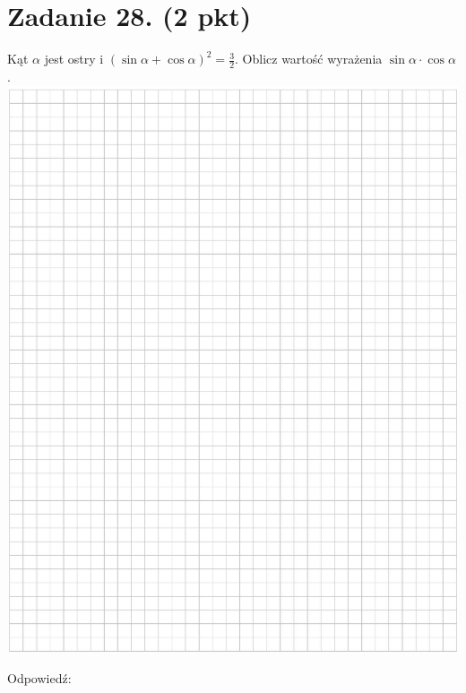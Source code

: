 \documentclass[10pt]{article}
\begin{document}
\section*{Zadanie 28. (2 pkt)}
Kąt \(\alpha\) jest ostry i \((\sin \alpha+\cos \alpha)^{2}=\frac{3}{2}\). Oblicz wartość wyrażenia \(\sin \alpha \cdot \cos \alpha\).\\
\includegraphics[max width=\textwidth, center]{2024_11_21_779b7f825da3a12753feg-14}

Odpowiedź:
\end{document}

